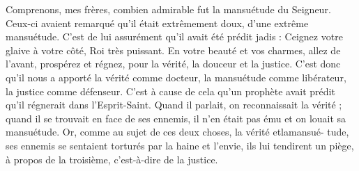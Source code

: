Comprenons, mes frères, combien admirable fut la mansuétude du Seigneur. Ceux-ci avaient remarqué qu’il était extrêmement doux, d’une extrême mansuétude. C’est de lui assurément qu’il avait été prédit jadis : Ceignez votre glaive à votre côté, Roi très puissant. En votre beauté et vos charmes, allez de l'avant, prospérez et régnez, pour la vérité, la douceur et la justice. C’est donc qu’il nous a apporté la vérité comme docteur, la mansuétude comme libérateur, la justice comme défenseur. C’est à cause de cela qu’un prophète avait prédit qu’il régnerait dans l’Esprit-Saint. Quand il parlait, on reconnaissait la vérité ; quand il se trouvait en face de ses ennemis, il n’en était pas ému et on louait sa mansuétude. Or, comme au sujet de ces deux choses, la vérité etlamansué- tude, ses ennemis se sentaient torturés par la haine et l’envie, ils lui tendirent un piège, à propos de la troisième, c’est-à-dire de la justice.
